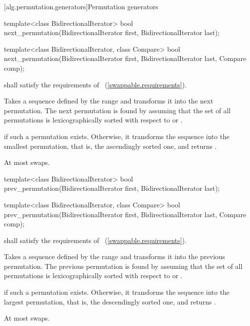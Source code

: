 [alg.permutation.generators]{Permutation generators}

%
\begin{itemdecl}
template<class BidirectionalIterator>
  bool next_permutation(BidirectionalIterator first,
                        BidirectionalIterator last);

template<class BidirectionalIterator, class Compare>
  bool next_permutation(BidirectionalIterator first,
                        BidirectionalIterator last, Compare comp);
\end{itemdecl}

\begin{itemdescr}
\pnum
\requires
{} shall satisfy the requirements of
~(\ref{swappable.requirements}).

\pnum
\effects
Takes a sequence defined by the range
and transforms it into the next permutation.
The next permutation is found by assuming that the set of all permutations is
lexicographically sorted with respect to
or .

\pnum
\returns
{}
if such a permutation exists.
Otherwise, it transforms the sequence into the smallest permutation,
that is, the ascendingly sorted one, and returns
.

\pnum
\complexity
At most
swaps.
\end{itemdescr}

%
\begin{itemdecl}
template<class BidirectionalIterator>
  bool prev_permutation(BidirectionalIterator first,
                        BidirectionalIterator last);

template<class BidirectionalIterator, class Compare>
  bool prev_permutation(BidirectionalIterator first,
                        BidirectionalIterator last, Compare comp);
\end{itemdecl}

\begin{itemdescr}
\pnum
\requires
{} shall satisfy the requirements of
~(\ref{swappable.requirements}).

\pnum
\effects
Takes a sequence defined by the range
and transforms it into the previous permutation.
The previous permutation is found by assuming that the set of all permutations is
lexicographically sorted with respect to
or .

\pnum
\returns
{}
if such a permutation exists.
Otherwise, it transforms the sequence into the largest permutation,
that is, the descendingly sorted one, and returns
.

\pnum
\complexity
At most
swaps.
\end{itemdescr}


